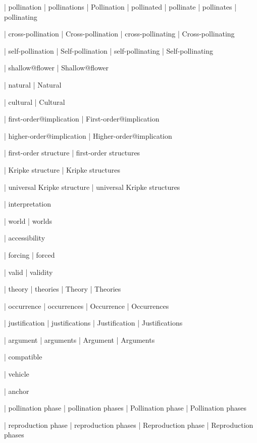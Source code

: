  | pollination
 | pollinations
 | Pollination
 | pollinated
 | pollinate
 | pollinates
 | pollinating

 | cross-pollination
 | Cross-pollination
 | cross-pollinating
 | Cross-pollinating

 | self-pollination
 | Self-pollination
 | self-pollinating
 | Self-pollinating

 | shallow@flower
 | Shallow@flower

 | natural
 | Natural

 | cultural
 | Cultural
 
 | first-order@implication
 | First-order@implication

 | higher-order@implication
 | Higher-order@implication

 | first-order structure
 | first-order structures

 | Kripke structure
 | Kripke structures

 | universal Kripke structure
 | universal Kripke structures

 | interpretation

 | world
 | worlds

 | accessibility

 | forcing
 | forced

 | valid
 | validity

 | theory
 | theories
 | Theory
 | Theories
 
 | occurrence
 | occurrences
 | Occurrence
 | Occurrences

 | justification
 | justifications
 | Justification
 | Justifications

 | argument
 | arguments
 | Argument
 | Arguments

 | compatible

 | vehicle

 | anchor
 
 | pollination phase
 | pollination phases
 | Pollination phase
 | Pollination phases

 | reproduction phase
 | reproduction phases
 | Reproduction phase
 | Reproduction phases


